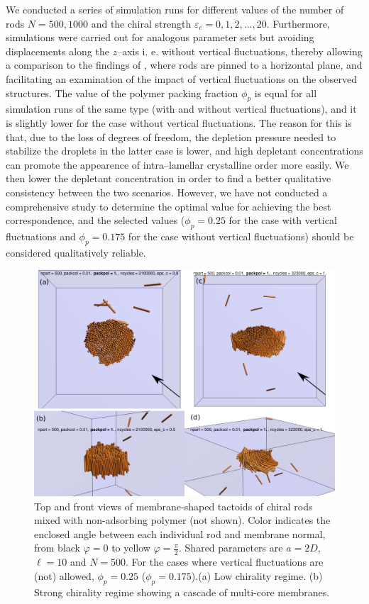 We conducted a series of simulation runs for different values of the number of rods $N = {500, 1000}$ and the chiral strength $\varepsilon_c={0,1,2,\ldots,20}$. Furthermore, simulations were carried out for analogous parameter sets but avoiding displacements along the $z$--axis i. e. without vertical fluctuations, thereby allowing a comparison to the findings of \cite{kuhnhold2022colloidal}, where rods are pinned to a horizontal plane, and facilitating an examination of the impact of vertical fluctuations on the observed structures. The value of the polymer packing fraction $\phi_p$ is equal for all simulation runs of the same type (with and without vertical fluctuations), and it is slightly lower for the case without vertical fluctuations. The reason for this is that, due to the loss of degrees of freedom, the depletion pressure needed to stabilize the droplets in the latter case is lower, and high depletant concentrations can promote the appearence of intra--lamellar crystalline order more easily. We then lower the depletant concentration in order to find a better qualitative consistency between the two scenarios. However, we have not conducted a comprehensive study to determine the optimal value for achieving the best correspondence, and the selected values ($\phi_p=0.25$ for the case with vertical fluctuations and $\phi_p=0.175$ for the case without vertical fluctuations) should be considered qualitatively reliable.


\begin{figure}
\begin{center}
\includegraphics[width= .8\columnwidth]{figures/chapter-5/samples}
	\caption[Top and front views of membrane-shaped tactoids of chiral rods mixed with non-adsorbing polymer]{Top and front views of membrane-shaped tactoids of chiral rods mixed with non-adsorbing polymer (not shown). Color indicates the enclosed angle between each individual rod and membrane normal, from black $\varphi = 0$ to yellow $\varphi = \frac{\pi}{2}$. Shared parameters are $a = 2D$, $\ell = 10$ and $N = 500$. For the cases where vertical fluctuations are (not) allowed, $\phi_p=0.25$ ($\phi_p=0.175$).(a) Low chirality regime. (b) Strong chirality regime showing a cascade of multi-core membranes.}
 \label{multidomain}
\end{center}
\end{figure}


